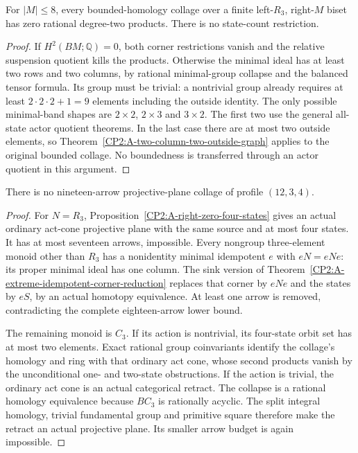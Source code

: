 \begin{lemma}
\label{CP2:A-eight-source-right-zero-all-states}
For $|M|\le8$, every bounded-homology collage over a finite
left-$R_3$, right-$M$ biset has zero rational degree-two products.
There is no state-count restriction.
\end{lemma}
\begin{proof}
If $H^2(BM;\mathbb Q)=0$, both corner restrictions vanish and the
relative suspension quotient kills the products.  Otherwise the
minimal ideal has at least two rows and two columns, by rational
minimal-group collapse and the balanced tensor formula.  Its group
must be trivial: a nontrivial group already requires at least
$2\cdot2\cdot2+1=9$ elements including the outside identity.
The only possible minimal-band shapes are $2\times2$, $2\times3$
and $3\times2$.  The first two use the general all-state actor
quotient theorems.  In the last case there are at most two outside
elements, so Theorem~\ref{CP2:A-two-column-two-outside-graph} applies
to the original bounded collage.  No boundedness is transferred
through an actor quotient in this argument.
\end{proof}

\begin{lemma}
\label{CP2:A-twelve-three-four-nineteen}
There is no nineteen-arrow projective-plane collage of profile
$(12,3,4)$.
\end{lemma}
\begin{proof}
For $N=R_3$, Proposition~\ref{CP2:A-right-zero-four-states} gives an
actual ordinary act-cone projective plane with the same source and
at most four states.  It has at most seventeen arrows, impossible.
Every nongroup three-element monoid other than $R_3$ has a
nonidentity minimal idempotent $e$ with $eN=eNe$: its proper minimal
ideal has one column.  The sink version of
Theorem~\ref{CP2:A-extreme-idempotent-corner-reduction} replaces that
corner by $eNe$ and the states by $eS$, by an actual homotopy
equivalence.  At least one arrow is removed, contradicting the
complete eighteen-arrow lower bound.

The remaining monoid is $C_3$.  If its action is nontrivial, its
four-state orbit set has at most two elements.  Exact rational
group coinvariants identify the collage's homology and ring with
that ordinary act cone, whose second products vanish by the
unconditional one- and two-state obstructions.  If the action is
trivial, the ordinary act cone is an actual categorical retract.
The collapse is a rational homology equivalence because $BC_3$ is
rationally acyclic.  The split integral homology, trivial fundamental
group and primitive square therefore make the retract an actual
projective plane.  Its smaller arrow budget is again impossible.
\end{proof}

